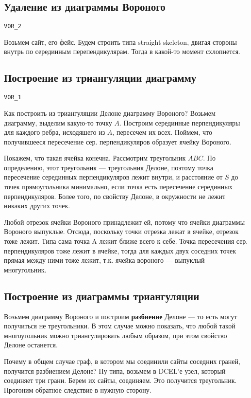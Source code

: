 \documentclass[11pt]{article}
\begin{document}
\subsection{Удаление из диаграммы Вороного}
\label{sec:orgheadline53}
\texttt{VOR\_2}

Возьмем сайт, его фейс. Будем строить типа straight skeleton,
двигая стороны внутрь по серединным перепендикулярам. Тогда в
какой-то момент схлопнется.
\subsection{Построение из триангуляции диаграмму}
\label{sec:orgheadline54}
\texttt{VOR\_1}

Как построить из триангуляции Делоне диаграмму Вороного?  Возьмем
диаграмму, выделим какую-то точку \(A\). Построим серединные
перпендикуляры для каждого ребра, исходяшего из \(A\), пересечем их
всех. Поймем, что получившееся пересечение сер. перпендикуляров
образует ячейку Вороного.

Покажем, что такая ячейка конечна. Рассмотрим треугольник \(ABC\). По
определению, этот треугольник --- треугольник Делоне, поэтому точка
пересечение серединных перпендикуляров лежит внутри, и расстояние
от \(S\) до точек прямоугольника минимально, если точка есть
пересечение серединных перпендикуляров. Более того, по свойству
Делоне, в окружности не лежит никаких других точек.

Любой отрезок ячейки Вороного принадлежит ей, потому что ячейки
диаграммы Вороного выпуклые. Отсюда, поскольку точки отрезка лежат в
ячейке, отрезок тоже лежит. Типа сама точка A лежит ближе всего к
себе. Точка пересечения сер. перпендикуляров тоже лежит в ячейке,
тогда для каждых двух соседних точек прямая между ними тоже лежит,
т.к. ячейка вороного --- выпуклый многугольник.
\subsection{Построение из диаграммы триангуляции}
\label{sec:orgheadline55}
Возьмем диаграмму Вороного и построим \textbf{разбиение} Делоне --- то есть
могут получиться не треугольники. В этом случае можно показать, что
любой такой многоугольник можно триангулировать любым образом, при
этом свойство Делоне останется.

Почему в общем случае граф, в котором мы соединили сайты соседних
граней, получится разбиением Делоне? Ну типа, возьмем в DCEL'е
узел, который соединяет три грани. Берем их сайты, соединяем. Это
получится треугольник. Прогоним обратное следствие в нужную
сторону.
\end{document}
